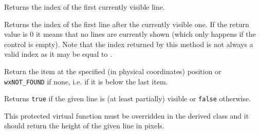 \label{wxvscrolledwindowgetvisiblebegin}


Returns the index of the first currently visible line.




\label{wxvscrolledwindowgetvisibleend}


Returns the index of the first line after the currently visible one. If the
return value is $0$ it means that no lines are currently shown (which only
happens if the control is empty). Note that the index returned by this method
is not always a valid index as it may be equal to .




\label{wxvscrolledwindowhittest}



Return the item at the specified (in physical coordinates) position or
{\tt wxNOT\_FOUND} if none, i.e. if it is below the last item.


\label{wxvscrolledwindowisvisible}


Returns {\tt true} if the given line is (at least partially) visible or 
{\tt false} otherwise.


\label{wxvscrolledwindowongetlineheight}


This protected virtual function must be overridden in the derived class and it
should return the height of the given line in pixels.




